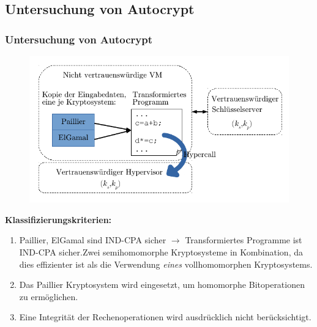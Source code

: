 \documentclass[handout,usenames,dvipsnames]{beamer}
\begin{document}
\subsection{Untersuchung von Autocrypt \cite{tople2013autocrypt} }
\begin{frame}
	\frametitle{Untersuchung von Autocrypt \cite{tople2013autocrypt} }
	\begin{figure}
		\includegraphics[]{fig/Autocrypt.pdf} 
	\end{figure}
\end{frame}

\begin{frame}
	\textbf{Klassifizierungskriterien:}
	\begin{enumerate}
		\item Paillier, ElGamal sind IND-CPA sicher $\rightarrow$ Transformiertes Programme ist IND-CPA sicher.\newline Zwei semihomomorphe Kryptosysteme in Kombination, da dies effizienter ist als die Verwendung \textit{eines} vollhomomorphen Kryptosystems. 
		\item Das Paillier Kryptosystem wird eingesetzt, um homomorphe Bitoperationen zu ermöglichen.
		\item Eine Integrität der Rechenoperationen wird ausdrücklich nicht berücksichtigt.
	\end{enumerate}
\end{frame}
\end{document}
